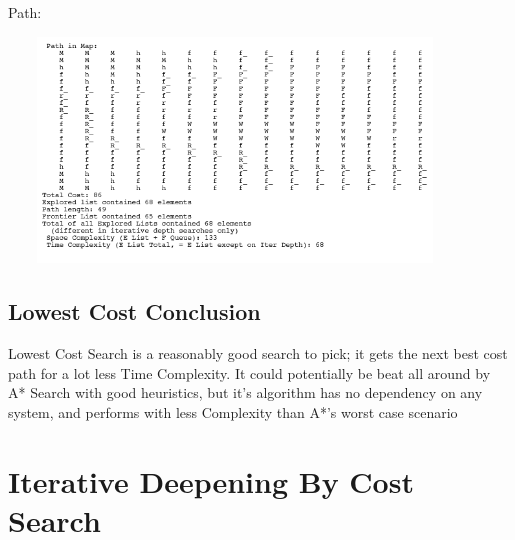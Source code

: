 \documentclass[12pt]{article}
\begin{document}
	\pagebreak

	Path:
	\begin{center}
		\includegraphics[width=120mm,height=60mm]{images/cost/final_map_path.png}
	\end{center}

	\subsection{Lowest Cost Conclusion}
	Lowest Cost Search is a reasonably good search to pick; it gets the next best cost path for a lot less Time Complexity. It could potentially be beat all around by A* Search with good heuristics, but it's algorithm has no dependency on any system, and performs with less Complexity than A*'s worst case scenario

\section{Iterative Deepening By Cost Search}
\end{document}
